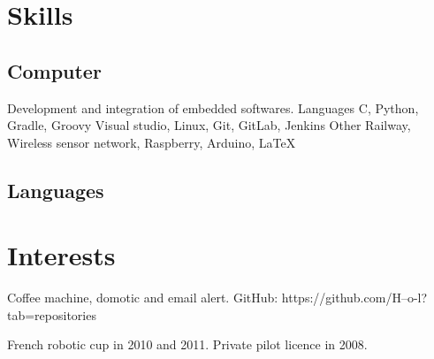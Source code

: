 \documentclass[10pt,a4paper]{moderncv}
\begin{document}
\section{Skills}

	\subsection{Computer}

		{Development and integration of embedded softwares.\newline{}}
		{Languages}
		{C, Python, Gradle, Groovy}
		{Visual studio, Linux, Git, GitLab, Jenkins\newline{}}
		{Other}
		{Railway, Wireless sensor network, Raspberry, Arduino, \LaTeX} 

	\subsection{Languages}


\section{Interests}
      {\small Coffee machine, domotic and email alert.\newline{}
              GitHub: https://github.com/H--o-l?tab=repositories\newline{}}

      {\small French robotic cup in 2010 and 2011.\newline{}
              Private pilot licence in 2008.}
\end{document}
